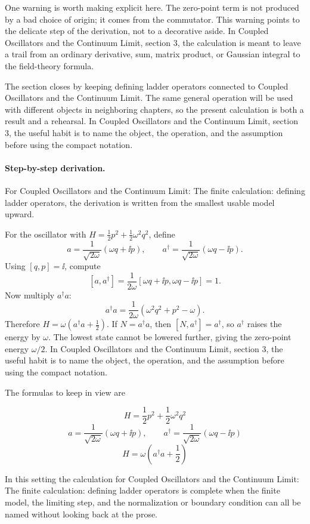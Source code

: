 One warning is worth making explicit here.  The zero-point term is not produced by a bad choice of origin; it comes from the commutator.  This warning points to the delicate step of the derivation, not to a decorative aside.  In Coupled Oscillators and the Continuum Limit, section 3, the calculation is meant to leave a trail from an ordinary derivative, sum, matrix product, or Gaussian integral to the field-theory formula.

The section closes by keeping defining ladder operators connected to Coupled Oscillators and the Continuum Limit.  The same general operation will be used with different objects in neighboring chapters, so the present calculation is both a result and a rehearsal.  In Coupled Oscillators and the Continuum Limit, section 3, the useful habit is to name the object, the operation, and the assumption before using the compact notation.



\paragraph{Step-by-step derivation.}

For Coupled Oscillators and the Continuum Limit: The finite calculation: defining ladder operators, the derivation is written from the smallest usable model upward.

For the oscillator with \(H=\frac12p^2+\frac12\omega^2q^2\), define
\[
  a=\frac{1}{\sqrt{2\omega}}(\omega q+\ii p),\qquad
  a^\dagger=\frac{1}{\sqrt{2\omega}}(\omega q-\ii p).
\]
Using \([q,p]=\ii\), compute
\[
  [a,a^\dagger]
  =
  \frac{1}{2\omega}[\omega q+\ii p,\omega q-\ii p]=1.
\]
Now multiply \(a^\dagger a\):
\[
  a^\dagger a=\frac{1}{2\omega}(\omega^2q^2+p^2-\omega).
\]
Therefore \(H=\omega(a^\dagger a+\frac12)\).  If \(N=a^\dagger a\), then \([N,a^\dagger]=a^\dagger\), so \(a^\dagger\) raises the energy by \(\omega\).  The lowest state cannot be lowered further, giving the zero-point energy \(\omega/2\).  In Coupled Oscillators and the Continuum Limit, section 3, the useful habit is to name the object, the operation, and the assumption before using the compact notation.

The formulas to keep in view are

\[
  H=\frac12p^2+\frac12\omega^2q^2
\]
\[
  a=\frac{1}{\sqrt{2\omega}}(\omega q+\ii p),\qquad a^\dagger=\frac{1}{\sqrt{2\omega}}(\omega q-\ii p)
\]
\[
  H=\omega\left(a^\dagger a+\frac12\right)
\]

In this setting the calculation for Coupled Oscillators and the Continuum Limit: The finite calculation: defining ladder operators is complete when the finite model, the limiting step, and the normalization or boundary condition can all be named without looking back at the prose.




